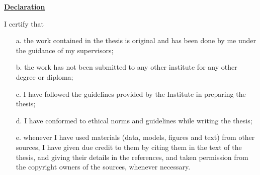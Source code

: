 \thispagestyle{empty}


\baselineskip \centerline{\underline{\Large{\bf
Declaration}}} \baselineskip \noindent I certify that

\begin{itemize}

\item [a.] the work contained in the thesis is original and has
been done by me under the guidance of my supervisors;

\item [b.] the work has not been submitted to any other institute
for any other degree or diploma;

\item [c.] I have followed the guidelines provided by the Institute
in preparing the thesis;

\item [d.] I have conformed to ethical norms and guidelines while
writing the thesis;

\item [e.] whenever I have used materials (data, models, figures and text) from other
sources, I have given due credit to them by citing them in the text
of the thesis, and giving their details in the references, and taken
permission from the copyright owners of the sources, whenever
necessary.

\end{itemize}

\vspace{2cm} \authorName
